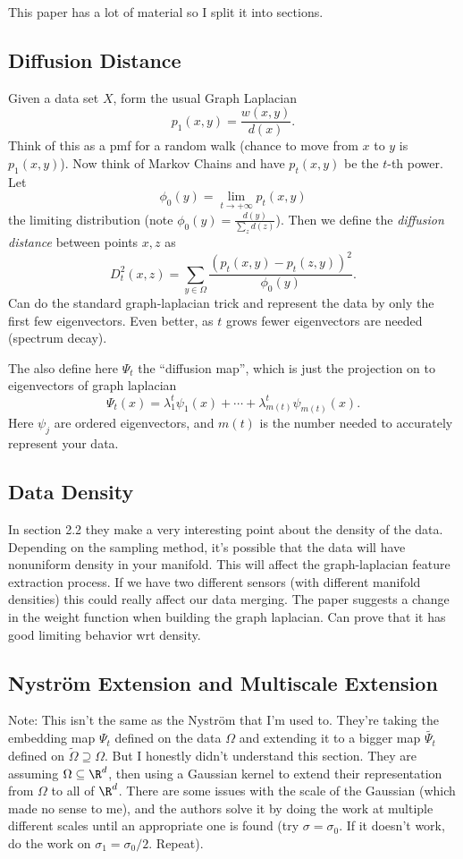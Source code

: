 \documentclass{article}[11pt]
\begin{document}
This paper has a lot of material so I split it into sections.

\subsection{Diffusion Distance}
Given a data set $X$, form the usual Graph Laplacian
\[p_1(x,y) = \frac{w(x,y)}{d(x)}.\] Think of this as a pmf for a random walk
(chance to move from $x$ to $y$ is $p_1(x,y)$). Now think of Markov Chains and
have $p_t(x,y)$ be the $t$-th power. Let
\[\phi_0(y)=\lim_{t\to +\infty}p_t(x,y)\]
the limiting distribution (note $\phi_0(y)=\frac{d(y)}{\sum_z d(z)}$). Then we
define the \emph{diffusion distance} between points $x,z$ as
\[D^2_t(x,z)=\sum_{y\in\Omega}\frac{\left(p_t(x,y) -
      p_t(z,y)\right)^2}{\phi_0(y)}.\]
Can do the standard graph-laplacian trick and represent the data by only the first few eigenvectors. Even better, as $t$ grows fewer eigenvectors are needed (spectrum decay).

The also define here $\Psi_t$ the ``diffusion map'', which is just the projection on to eigenvectors of graph laplacian
\[\Psi_t(x) = \lambda_1^t\psi_1(x) + \cdots + \lambda_{m(t)}^t\psi_{m(t)}(x).\]
Here $\psi_j$ are ordered eigenvectors, and $m(t)$ is the number needed to accurately represent your data.

\subsection{Data Density}
In section 2.2 they make a very interesting point about the density of the data. Depending on the sampling method, it's possible that the data will have nonuniform density in your manifold. This will affect the graph-laplacian feature extraction process. If we have two different sensors (with different manifold densities) this could really affect our data merging. The paper suggests a change in the weight function when building the graph laplacian. Can prove that it has good limiting behavior wrt density.

\subsection{Nystr\"{o}m Extension and Multiscale Extension}
Note: This isn't the same as the Nystr\"{o}m that I'm used to. They're taking the embedding map $\Psi_t$ defined on the data $\Omega$ and extending it to a bigger map $\tilde{\Psi_t}$ defined on $\tilde{\Omega}\supseteq \Omega$. But I honestly didn't understand this section. They are assuming $\Omega \subseteq \R^d$, then using a Gaussian kernel to extend their representation from $\Omega$ to all of $\R^d$. There are some issues with the scale of the Gaussian (which made no sense to me), and the authors solve it by doing the work at multiple different scales until an appropriate one is found (try $\sigma = \sigma_0$. If it doesn't work, do the work on $\sigma_1 = \sigma_0/2$. Repeat).
\end{document}
